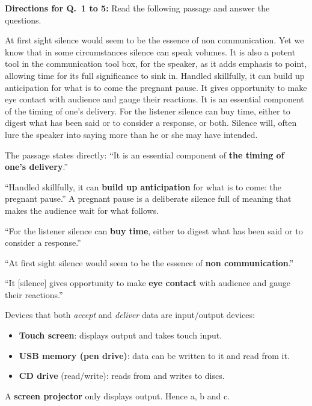 \textbf{Directions for Q.~1 to 5:} Read the following passage and answer the questions.\par\smallskip
At first sight silence would seem to be the essence of non communication. Yet we know that in some circumstances silence can speak volumes. It is also a potent tool in the communication tool box, for the speaker, as it adds emphasis to point, allowing time for its full significance to sink in. Handled skillfully, it can build up anticipation for what is to come the pregnant pause. It gives opportunity to make eye contact with audience and gauge their reactions. It is an essential component of the timing of one's delivery. For the listener silence can buy time, either to digest what has been said or to consider a response, or both. Silence will, often lure the speaker into saying more than he or she may have intended.

The passage states directly: ``It is an essential component of \textbf{the timing of one's delivery}.''

``Handled skillfully, it can \textbf{build up anticipation} for what is to come: the pregnant pause.'' A pregnant pause is a deliberate silence full of meaning that makes the audience wait for what follows.

``For the listener silence can \textbf{buy time}, either to digest what has been said or to consider a response.''

``At first sight silence would seem to be the essence of \textbf{non communication}.''

``It [silence] gives opportunity to make \textbf{eye contact} with audience and gauge their reactions.''

Devices that both \emph{accept} and \emph{deliver} data are input/output devices:
\begin{itemize}
\item \textbf{Touch screen}: displays output and takes touch input.
\item \textbf{USB memory (pen drive)}: data can be written to it and read from it.
\item \textbf{CD drive} (read/write): reads from and writes to discs.
\end{itemize}
A \textbf{screen projector} only displays output. Hence a, b and c.

